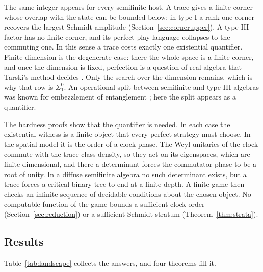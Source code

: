 The same integer appears for every semifinite host. A trace gives a finite corner whose overlap with the state can be bounded below; in type I a rank-one corner recovers the largest Schmidt amplitude (Section~\ref{sec:cornerupper}). A type-III factor has no finite corner, and its perfect-play language collapses to the commuting one. In this sense a trace costs exactly one existential quantifier. Finite dimension is the degenerate case: there the whole space is a finite corner, and once the dimension is fixed, perfection is a question of real algebra that Tarski's method decides \cite{BPR}. Only the search over the dimension remains, which is why that row is $\Sigma^0_1$. An operational split between semifinite and type III algebras was known for embezzlement of entanglement \cite{VLSWW}; here the split appears as a quantifier.

The hardness proofs show that the quantifier is needed. In each case the existential witness is a finite object that every perfect strategy must choose. In the spatial model it is the order of a clock phase. The Weyl unitaries of the clock commute with the trace-class density, so they act on its eigenspaces, which are finite-dimensional, and there a determinant forces the commutator phase to be a root of unity. In a diffuse semifinite algebra no such determinant exists, but a trace forces a critical binary tree to end at a finite depth. A finite game then checks an infinite sequence of decidable conditions about the chosen object. No computable function of the game bounds a sufficient clock order (Section~\ref{sec:reduction}) or a sufficient Schmidt stratum (Theorem~\ref{thm:strata}).

\subsection{Results}\label{sec:results}
Table~\ref{tab:landscape} collects the answers, and four theorems fill it.


